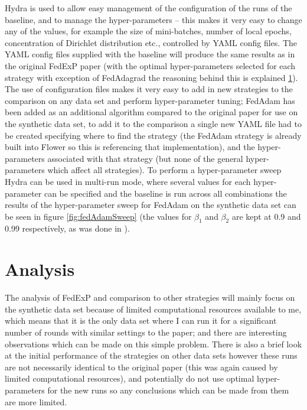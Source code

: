 \documentclass{article}
\begin{document}
Hydra is used to allow easy management of the configuration of the runs of the baseline, and to manage the hyper-parameters -- this makes it very easy to change any of the values, for example the size of mini-batches, number of local epochs, concentration of Dirichlet distribution etc., controlled by YAML config files.  The YAML config files supplied with the baseline will produce the same results as in the original FedExP paper (with the optimal hyper-parameters selected for each strategy with exception of FedAdagrad the reasoning behind this is explained \ref{Analysis}).  The use of configuration files makes it very easy to add in new strategies to the comparison on any data set and perform hyper-parameter tuning; FedAdam has been added as an additional algorithm compared to the original paper for use on the synthetic data set, to add it to the comparison a single new YAML file had to be created specifying where to find the strategy (the FedAdam strategy is already built into Flower so this is referencing that implementation), and the hyper-parameters associated with that strategy (but none of the general hyper-parameters which affect all strategies).  To perform a hyper-parameter sweep Hydra can be used in multi-run mode, where several values for each hyper-parameter can be specified and the baseline is run across all combinations the results of the hyper-parameter sweep for FedAdam on the synthetic data set can be seen in figure \ref{fig:fedAdamSweep} (the values for $\beta_1$ and $\beta_2$ are kept at 0.9 and 0.99 respectively, as was done in \cite{AdaptiveFederatedOptimisation}).

\section{Analysis}
\label{Analysis}

The analysis of FedExP and comparison to other strategies will mainly focus on the synthetic data set because of limited computational resources available to me, which means that it is the only data set where I can run it for a significant number of rounds with similar settings to the paper; and there are interesting observations which can be made on this simple problem.  There is also a brief look at the initial performance of the strategies on other data sets however these runs are not necessarily identical to the original paper (this was again caused by limited computational resources), and potentially do not use optimal hyper-parameters for the new runs so any conclusions which can be made from them are more limited.
\end{document}
